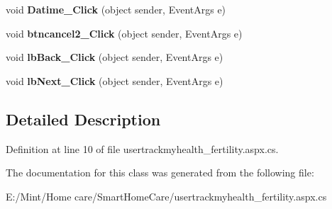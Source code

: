 \begin{DoxyCompactItemize}
\item 
\hypertarget{classusertrackmyhealth__fertility_a679e21956795392cc2fa653a7327c793}{void {\bfseries Datime\-\_\-\-Click} (object sender, Event\-Args e)}\label{classusertrackmyhealth__fertility_a679e21956795392cc2fa653a7327c793}

\item 
\hypertarget{classusertrackmyhealth__fertility_a583e6dfbd2344f7deb237fe185b20449}{void {\bfseries btncancel2\-\_\-\-Click} (object sender, Event\-Args e)}\label{classusertrackmyhealth__fertility_a583e6dfbd2344f7deb237fe185b20449}

\item 
\hypertarget{classusertrackmyhealth__fertility_a968421ef994f35815579459599b1a17f}{void {\bfseries lb\-Back\-\_\-\-Click} (object sender, Event\-Args e)}\label{classusertrackmyhealth__fertility_a968421ef994f35815579459599b1a17f}

\item 
\hypertarget{classusertrackmyhealth__fertility_aecee0709a0cabf0b23b86208e944313b}{void {\bfseries lb\-Next\-\_\-\-Click} (object sender, Event\-Args e)}\label{classusertrackmyhealth__fertility_aecee0709a0cabf0b23b86208e944313b}

\end{DoxyCompactItemize}


\subsection{Detailed Description}


Definition at line 10 of file usertrackmyhealth\-\_\-fertility.\-aspx.\-cs.



The documentation for this class was generated from the following file\-:\begin{DoxyCompactItemize}
\item 
E\-:/\-Mint/\-Home care/\-Smart\-Home\-Care/usertrackmyhealth\-\_\-fertility.\-aspx.\-cs\end{DoxyCompactItemize}
